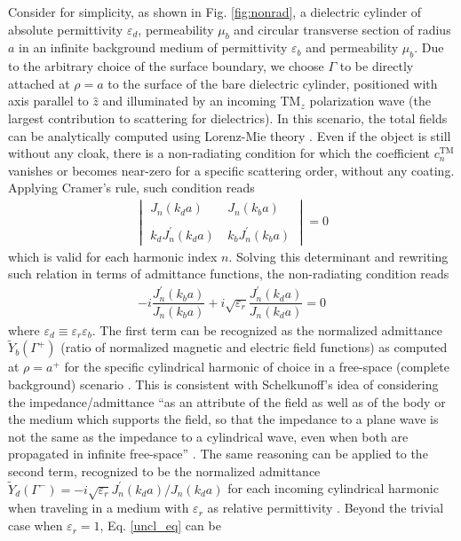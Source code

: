 \documentclass[reprint, showpacs, amsmath,amssymb, aps,
prb]{revtex4-1}
\begin{document}
Consider for simplicity, as shown in Fig. \ref{fig:nonrad}, a dielectric cylinder of absolute permittivity $\varepsilon_d$, permeability $\mu_b$ and circular transverse section of radius $a$ in an infinite background medium of permittivity $\varepsilon_b$ and permeability $\mu_b$. %
Due to the arbitrary choice of the surface boundary, we choose  $\Gamma$ to be directly attached at $\rho=a$ to the surface of the bare dielectric cylinder, positioned with axis parallel to $\hat{z}$ and illuminated by an incoming TM$_z$ polarization wave (the largest contribution to scattering for dielectrics). In this scenario, the total fields can be analytically computed using  Lorenz-Mie theory \cite{Bohren}. 
%
Even if the object is still without any cloak, there is a non-radiating condition for which the coefficient $c_n^{\mbox{TM}}$ vanishes or becomes near-zero for a specific scattering order, without any coating. Applying Cramer's rule, such condition reads 
%
\begin{align}
\begin{vmatrix}
 J_n(k_d a) &\ J_n(k_b a) \\ &\  \\   k_d  J^{'}_n(k_d a) &\ k_b J^{'}_n(k_b a)\end{vmatrix}=0
\end{align}
%
which is valid for each harmonic index $n$.
Solving this determinant and rewriting such relation in terms of admittance functions, the non-radiating condition reads
%
\begin{align}
-i\dfrac{J^{'}_n(k_b a)}{J_n(k_b a)} +i\sqrt{\varepsilon_r}\dfrac{J^{'}_n(k_d a)}{J_n(k_d a)} =0 
\label{uncl_eq}
\end{align}
%
where $\varepsilon_d\equiv\varepsilon_r\varepsilon_b$.
The first term can be recognized as the normalized admittance $\widetilde{Y}_b(\Gamma^+)$ (ratio of normalized magnetic and electric field functions) as computed at $\rho=a^+$ for the specific cylindrical harmonic of choice in a free-space (complete background) scenario \cite{Marcuvitz}. This is consistent with Schelkunoff's idea of considering the impedance/admittance ``as an attribute of the field as well as of the body or the medium which supports the field, so that the impedance to a plane wave is not the same as the impedance to a cylindrical wave, even when both are propagated in infinite free-space'' \cite{Imp_Gen}. The same reasoning can be applied to the second term,  recognized to be the normalized admittance $\widetilde{Y}_d(\Gamma^-)=-i\sqrt{\varepsilon_r} J^{'}_n(k_d a)/J_n(k_d a)$ for each incoming cylindrical harmonic when traveling in a medium with $\varepsilon_r$ as relative permittivity \cite{Marcuvitz}. Beyond the trivial case when $\varepsilon_r=1$, Eq. \eqref{uncl_eq} can be
\end{document}
